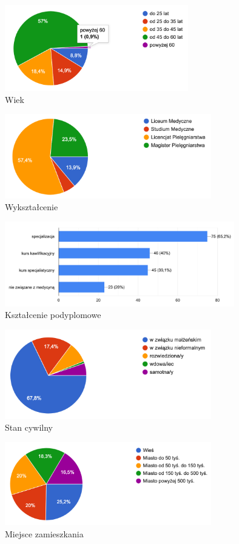 \documentclass[a4paper,12pt,twoside,openany]{report}
\begin{document}
\begin{figure}
\includegraphics[width=8cm]{char_gr_bad/wiek00}
\caption{Wiek}
\end{figure}

\begin{figure}
\includegraphics[width=9cm]{char_gr_bad/wyksztalc00}
\caption{Wykształcenie}
\end{figure}

\begin{figure}
\includegraphics[width=10cm]{char_gr_bad/podyplom00}
\caption{Kształcenie podyplomowe}
\end{figure}

\begin{figure}
\includegraphics[width=9cm]{char_gr_bad/cyw00}
\caption{Stan cywilny}
\end{figure}

\begin{figure}
\includegraphics[width=9cm]{char_gr_bad/zamieszka00}
\caption{Miejsce zamieszkania}
\end{figure}
\end{document}
